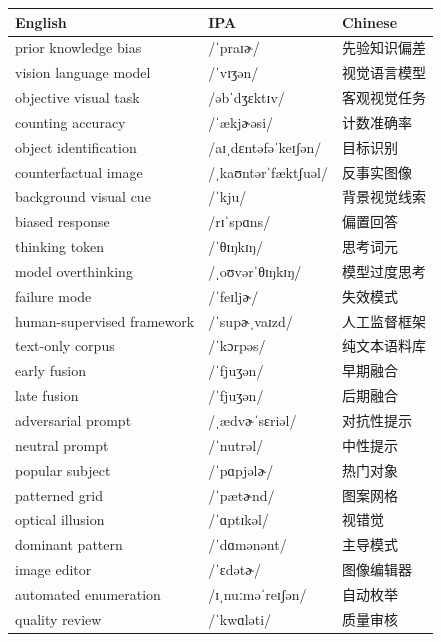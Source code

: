 \documentclass[UTF8,12pt,a4paper]{ctexart}
\providecommand{\zh}[1]{#1}
\begin{document}
\begin{tabular*}{\textwidth}{@{\extracolsep{\fill}}lll@{}}
\toprule
\textbf{English} & \textbf{IPA} & \textbf{Chinese} \\
\midrule
prior knowledge bias & {\ipafont /ˈpraɪɚ/} & \zh{先验知识偏差} \\
vision language model & {\ipafont /ˈvɪʒən/} & \zh{视觉语言模型} \\
objective visual task & {\ipafont /əbˈdʒɛktɪv/} & \zh{客观视觉任务} \\
counting accuracy & {\ipafont /ˈækjɚəsi/} & \zh{计数准确率} \\
object identification & {\ipafont /aɪˌdɛntəfəˈkeɪʃən/} & \zh{目标识别} \\
counterfactual image & {\ipafont /ˌkaʊntərˈfæktʃuəl/} & \zh{反事实图像} \\
background visual cue & {\ipafont /ˈkju/} & \zh{背景视觉线索} \\
biased response & {\ipafont /rɪˈspɑns/} & \zh{偏置回答} \\
thinking token & {\ipafont /ˈθɪŋkɪŋ/} & \zh{思考词元} \\
model overthinking & {\ipafont /ˌoʊvərˈθɪŋkɪŋ/} & \zh{模型过度思考} \\
failure mode & {\ipafont /ˈfeɪljɚ/} & \zh{失效模式} \\
human-supervised framework & {\ipafont /ˈsupɚˌvaɪzd/} & \zh{人工监督框架} \\
text-only corpus & {\ipafont /ˈkɔrpəs/} & \zh{纯文本语料库} \\
early fusion & {\ipafont /ˈfjuʒən/} & \zh{早期融合} \\
late fusion & {\ipafont /ˈfjuʒən/} & \zh{后期融合} \\
adversarial prompt & {\ipafont /ˌædvɚˈsɛriəl/} & \zh{对抗性提示} \\
neutral prompt & {\ipafont /ˈnutrəl/} & \zh{中性提示} \\
popular subject & {\ipafont /ˈpɑpjəlɚ/} & \zh{热门对象} \\
patterned grid & {\ipafont /ˈpætɚnd/} & \zh{图案网格} \\
optical illusion & {\ipafont /ˈɑptɪkəl/} & \zh{视错觉} \\
dominant pattern & {\ipafont /ˈdɑmənənt/} & \zh{主导模式} \\
image editor & {\ipafont /ˈɛdətɚ/} & \zh{图像编辑器} \\
automated enumeration & {\ipafont /ɪˌnuːməˈreɪʃən/} & \zh{自动枚举} \\
quality review & {\ipafont /ˈkwɑləti/} & \zh{质量审核} \\

\end{tabular*}
\end{document}
